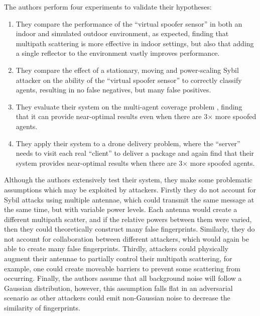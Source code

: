 The authors perform four experiments to validate their hypotheses:
\begin{enumerate}
    \item They compare the performance of the ``virtual spoofer sensor'' in both an indoor and simulated outdoor environment, as expected, finding that multipath scattering is more effective in indoor settings, but also that adding a single reflector to the environment vastly improves performance.
    \item They compare the effect of a stationary, moving and power-scaling Sybil attacker on the ability of the ``virtual spoofer sensor'' to correctly classify agents, resulting in no false negatives, but many false positives.
    \item They evaluate their system on the multi-agent coverage problem \cite{MultiAgentCoverage}, finding that it can provide near-optimal results even when there are 3$\times$ more spoofed agents.
    \item They apply their system to a drone delivery problem, where the ``server'' needs to visit each real ``client'' to deliver a package and again find that their system provides near-optimal results when there are 3$\times$ more spoofed agents.
\end{enumerate}


Although the authors extensively test their system, they make some problematic assumptions which may be exploited by attackers. Firstly they do not account for Sybil attacks using multiple antennae, which could transmit the same message at the same time, but with variable power levels. Each antenna would create a different multipath scatter, and if the relative powers between them were varied, then they could theoretically construct many false fingerprints. Similarly, they do not account for collaboration between different attackers, which would again be able to create many false fingerprints. Thirdly, attackers could physically augment their antennae to partially control their multipath scattering, for example, one could create moveable barriers to prevent some scattering from occurring. Finally, the authors assume that all background noise will follow a Gaussian distribution, however, this assumption falls flat in an adversarial scenario as other attackers could emit non-Gaussian noise to decrease the similarity of fingerprints.


